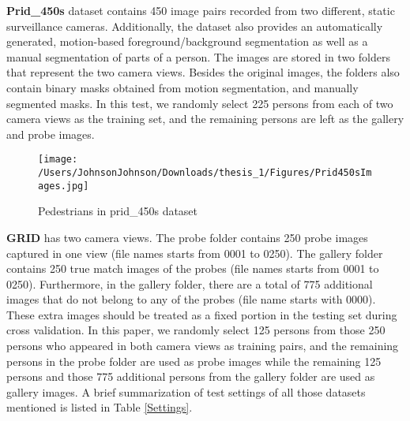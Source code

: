 \textbf{Prid\_450s} dataset contains 450 image pairs recorded from two different, static surveillance cameras. Additionally, the dataset also provides an automatically generated, motion-based foreground/background segmentation as well as a manual segmentation of parts of a person. The images are stored in two folders that represent the two camera views. Besides the original images, the folders also contain binary masks obtained from motion segmentation, and manually segmented masks. In this test, we randomly select 225 persons from each of two camera views as the training set, and the remaining persons are left as the gallery and probe images. 
\begin{figure}[H]
\begin{raggedleft}
\texttt{[image: /Users/JohnsonJohnson/Downloads/thesis\_1/Figures/Prid450sImages.jpg]}
\vspace{-3em}
\caption{Pedestrians in prid\_450s dataset}
\end{raggedleft}
\end{figure}
\noindent\textbf{GRID} has two camera views. The probe folder contains 250 probe images captured in one view (file names starts from 0001  to 0250). The gallery folder contains 250 true match images of the probes (file names starts from 0001  to 0250). Furthermore, in the gallery folder, there are a total of 775 additional images that do not belong to any of the probes (file name starts with 0000). These extra images should be treated as a fixed portion in the testing set during cross validation. In this paper, we randomly select 125 persons from those 250 persons who appeared in both camera views as training pairs, and the remaining persons in the probe folder are used as probe images while  the remaining 125 persons and those 775 additional persons from the gallery folder are used as gallery images. A brief summarization of test settings of all those datasets mentioned is listed in Table \ref{Settings}.

